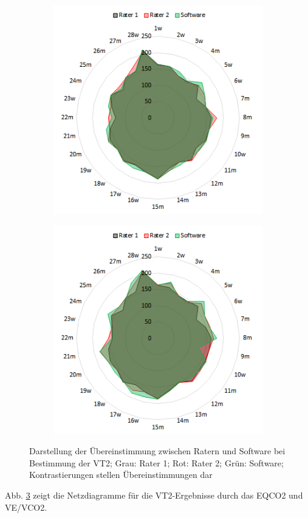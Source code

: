 \begin{figure}[H]
	\centering
	\begin{subfigure}[c]{0.45\textwidth}
		\centering
		\includegraphics[scale=0.7]{Bilder/eqco2_net}
		\label{subpic:pic3}
	\end{subfigure}%
	\hfil
	\begin{subfigure}[c]{0.45\textwidth}
		\centering
		\includegraphics[scale=0.7]{Bilder/ve_vco2_net}
		\label{subpic:pic4}
	\end{subfigure}
	\caption[Grafische Darstellung der Übereinstimmung für die VT2]{Darstellung der Übereinstimmung zwischen Ratern und Software bei Bestimmung der VT2; Grau: Rater 1; Rot: Rater 2; Grün: Software; Kontrastierungen stellen Übereinstimmungen dar}
	\label{pic:pic25}
\end{figure}
%
Abb. \ref{pic:pic25} zeigt die Netzdiagramme für die VT2-Ergebnisse durch das \gls{EQCO2} und \gls{VE}/\gls{VCO2}.

